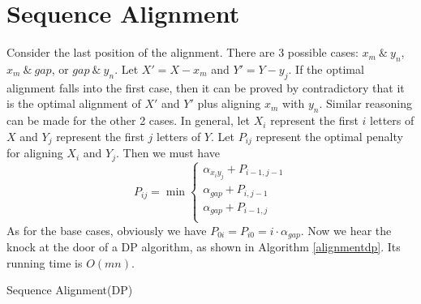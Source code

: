 \section{Sequence Alignment}
\begin{description}
\end{description}
Consider the last position of the alignment. There are 3 possible cases: $x_m\:\&\:y_n$, $x_m\:\&\:gap$, or $gap\:\&\:y_n$. Let $X'=X-x_m$ and $Y'=Y-y_j$. If the optimal alignment falls into the first case, then it can be proved by contradictory that it is the optimal alignment of $X'$ and $Y'$ plus aligning $x_m$ with $y_n$. Similar reasoning can be made for the other 2 cases. In general, let $X_i$ represent the first $i$ letters of $X$ and $Y_j$ represent the first $j$ letters of $Y$. Let $P_{ij}$ represent the optimal penalty for aligning $X_i$ and $Y_j$. Then we must have
\begin{equation*}
P_{ij}=\min\begin{cases}
\alpha_{x_iy_j}+P_{i-1,j-1}\\
\alpha_{gap}+P_{i,j-1}\\
\alpha_{gap}+P_{i-1,j}\\
\end{cases}\end{equation*}
As for the base cases, obviously we have $P_{0i}=P_{i0}=i\cdot\alpha_{gap}$. Now we hear the knock at the door of a DP algorithm, as shown in Algorithm \ref{alignmentdp}. Its running time is $O(mn)$.
\begin{algorithm}[ht]
\caption{Sequence Alignment(DP)}\label{alignmentdp}
\begin{algorithmic}[1]
\EndFor\EndFor
\end{algorithmic}
\end{algorithm}

